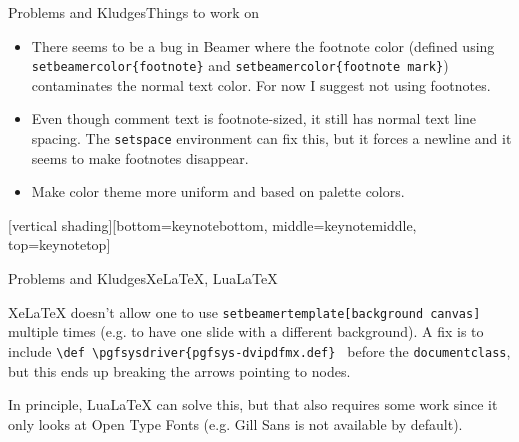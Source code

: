 \begin{frame}[c]{Problems and Kludges}{Things to work on}
	\begin{itemize}
		\item There seems to be a bug in Beamer where the footnote color (defined using \texttt{setbeamercolor\{footnote\}} and \texttt{setbeamercolor\{footnote mark\}}) contaminates the normal text color. For now I suggest not using footnotes. 
		\item Even though comment text is footnote-sized, it still has normal text line spacing. The \texttt{setspace} environment can fix this, but it forces a newline and it seems to make footnotes disappear. 
		\item Make color theme more uniform and based on palette colors.
	\end{itemize}
\end{frame}


[vertical shading][bottom=keynotebottom, middle=keynotemiddle, top=keynotetop]
\begin{frame}[c]{Problems and Kludges}{XeLaTeX, LuaLaTeX}
	 
	XeLaTeX doesn't allow one to use \texttt{setbeamertemplate[background canvas]} multiple times (e.g. to have one slide with a different background). A fix is to include \texttt{\textbackslash def \textbackslash pgfsysdriver\{pgfsys-dvipdfmx.def\} } before the \texttt{documentclass}, but this ends up breaking the arrows pointing to nodes.
	
	In principle, LuaLaTeX can solve this, but that also requires some work since it only looks at Open Type Fonts (e.g. Gill Sans is not available by default).
	
\end{frame}



